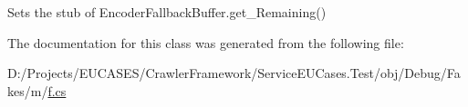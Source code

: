 Sets the stub of Encoder\-Fallback\-Buffer.\-get\-\_\-\-Remaining()



The documentation for this class was generated from the following file\-:\begin{DoxyCompactItemize}
\item 
D\-:/\-Projects/\-E\-U\-C\-A\-S\-E\-S/\-Crawler\-Framework/\-Service\-E\-U\-Cases.\-Test/obj/\-Debug/\-Fakes/m/\hyperlink{m_2f_8cs}{f.\-cs}\end{DoxyCompactItemize}
